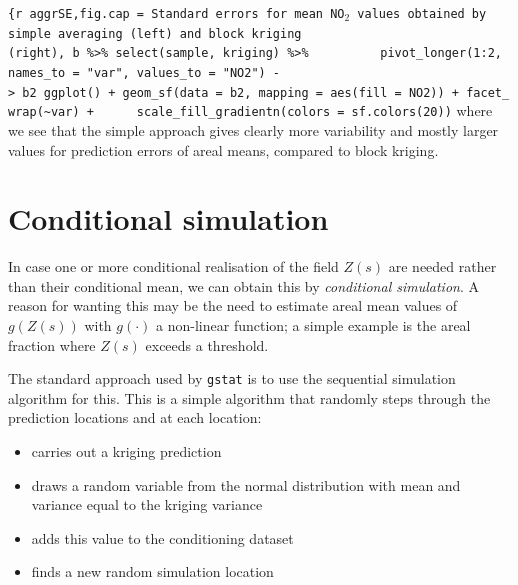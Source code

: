 \documentclass[]{book}
\newenvironment{Shaded}{\begin{snugshade}}{\end{snugshade}}
\newcommand{\KeywordTok}[1]{\textcolor[rgb]{0.13,0.29,0.53}{\textbf{#1}}}
\newcommand{\NormalTok}[1]{#1}
\newcommand{\OperatorTok}[1]{\textcolor[rgb]{0.81,0.36,0.00}{\textbf{#1}}}
\newcommand{\StringTok}[1]{\textcolor[rgb]{0.31,0.60,0.02}{#1}}
\providecommand{\tightlist}{%
  \setlength{\itemsep}{0pt}\setlength{\parskip}{0pt}}
\begin{document}
\begin{Shaded}
\end{Shaded}



\texttt{\{r\ aggrSE,fig.cap\ =\ \textquotesingle{}Standard errors for mean NO\(_2\) values obtained by simple averaging (left) and block kriging (right)\textquotesingle{},\ b\ \%\textgreater{}\%\ select(sample,\ kriging)\ \%\textgreater{}\%\ \ \ \ \ \ \ \ \ \ pivot\_longer(1:2,\ names\_to\ =\ "var",\ values\_to\ =\ "NO2")\ -\textgreater{}\ b2\ ggplot()\ +\ geom\_sf(data\ =\ b2,\ mapping\ =\ aes(fill\ =\ NO2))\ +\ facet\_wrap(\textasciitilde{}var)\ +\ \ \ \ \ \ scale\_fill\_gradientn(colors\ =\ sf.colors(20))}
where we see that the simple approach gives clearly more variability
and mostly larger values for prediction errors of areal means,
compared to block kriging.

\hypertarget{conditional-simulation}{%
\section{Conditional simulation}\label{conditional-simulation}}

In case one or more conditional realisation of the field \(Z(s)\)
are needed rather than their conditional mean, we can obtain this
by \emph{conditional simulation}. A reason for wanting this may be the
need to estimate areal mean values of \(g(Z(s))\) with \(g(\cdot)\)
a non-linear function; a simple example is the areal fraction where
\(Z(s)\) exceeds a threshold.

The standard approach used by \texttt{gstat} is to use the sequential
simulation algorithm for this. This is a simple algorithm that randomly
steps through the prediction locations and at each location:

\begin{itemize}
\tightlist
\item
  carries out a kriging prediction
\item
  draws a random variable from the normal distribution with mean and variance equal to the kriging variance
\item
  adds this value to the conditioning dataset
\item
  finds a new random simulation location
\end{itemize}
\end{document}
